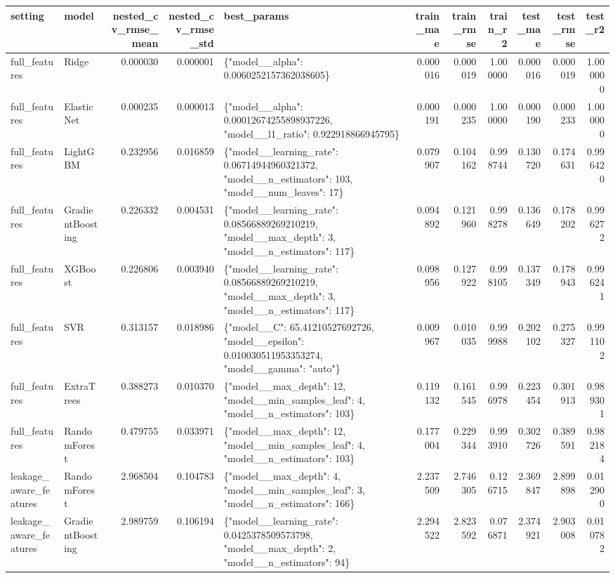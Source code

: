 \begin{tabular}{llrrlrrrrrr}
\toprule
setting & model & nested\_cv\_rmse\_mean & nested\_cv\_rmse\_std & best\_params & train\_mae & train\_rmse & train\_r2 & test\_mae & test\_rmse & test\_r2 \\
\midrule
full\_features & Ridge & 0.000030 & 0.000001 & \{"model\_\_alpha": 0.0060252157362038605\} & 0.000016 & 0.000019 & 1.000000 & 0.000016 & 0.000019 & 1.000000 \\
full\_features & ElasticNet & 0.000235 & 0.000013 & \{"model\_\_alpha": 0.00012674255898937226, "model\_\_l1\_ratio": 0.922918866945795\} & 0.000191 & 0.000235 & 1.000000 & 0.000190 & 0.000233 & 1.000000 \\
full\_features & LightGBM & 0.232956 & 0.016859 & \{"model\_\_learning\_rate": 0.06714944960321372, "model\_\_n\_estimators": 103, "model\_\_num\_leaves": 17\} & 0.079907 & 0.104162 & 0.998744 & 0.130720 & 0.174631 & 0.996420 \\
full\_features & GradientBoosting & 0.226332 & 0.004531 & \{"model\_\_learning\_rate": 0.08566889269210219, "model\_\_max\_depth": 3, "model\_\_n\_estimators": 117\} & 0.094892 & 0.121960 & 0.998278 & 0.136649 & 0.178202 & 0.996272 \\
full\_features & XGBoost & 0.226806 & 0.003940 & \{"model\_\_learning\_rate": 0.08566889269210219, "model\_\_max\_depth": 3, "model\_\_n\_estimators": 117\} & 0.098956 & 0.127922 & 0.998105 & 0.137349 & 0.178943 & 0.996241 \\
full\_features & SVR & 0.313157 & 0.018986 & \{"model\_\_C": 65.41210527692726, "model\_\_epsilon": 0.010030511953353274, "model\_\_gamma": "auto"\} & 0.009967 & 0.010035 & 0.999988 & 0.202102 & 0.275327 & 0.991102 \\
full\_features & ExtraTrees & 0.388273 & 0.010370 & \{"model\_\_max\_depth": 12, "model\_\_min\_samples\_leaf": 4, "model\_\_n\_estimators": 103\} & 0.119132 & 0.161545 & 0.996978 & 0.223454 & 0.301913 & 0.989301 \\
full\_features & RandomForest & 0.479755 & 0.033971 & \{"model\_\_max\_depth": 12, "model\_\_min\_samples\_leaf": 4, "model\_\_n\_estimators": 103\} & 0.177004 & 0.229344 & 0.993910 & 0.302726 & 0.389591 & 0.982184 \\
leakage\_aware\_features & RandomForest & 2.968504 & 0.104783 & \{"model\_\_max\_depth": 4, "model\_\_min\_samples\_leaf": 3, "model\_\_n\_estimators": 166\} & 2.237509 & 2.746305 & 0.126715 & 2.369847 & 2.899898 & 0.012900 \\
leakage\_aware\_features & GradientBoosting & 2.989759 & 0.106194 & \{"model\_\_learning\_rate": 0.0425378509573798, "model\_\_max\_depth": 2, "model\_\_n\_estimators": 94\} & 2.294522 & 2.823592 & 0.076871 & 2.374921 & 2.903008 & 0.010782 \\

\end{tabular}
